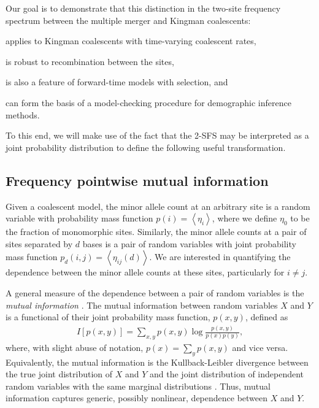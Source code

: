 \documentclass[11pt, letterpaper]{article}   	%
\newcommand{\E}[1]{\left< #1 \right>}
\begin{document}
Our goal is to demonstrate that this distinction in the two-site frequency spectrum between the multiple merger and Kingman coalescents:
\begin{enumerate*}
    \item applies to Kingman coalescents with time-varying coalescent rates,
    \item is robust to recombination between the sites,
    \item is also a feature of forward-time models with selection, and
    \item can form the basis of a model-checking procedure for demographic inference methods.
\end{enumerate*}
To this end, we will make use of the fact that the 2-SFS may be interpreted as a joint probability distribution to define the following useful transformation.

\subsection*{Frequency pointwise mutual information}

Given a coalescent model, the minor allele count at an arbitrary site is a random variable with probability mass function $p(i) = \E{\eta_i}$, where we define $\eta_0$ to be the fraction of monomorphic sites.
Similarly, the minor allele counts at a pair of sites separated by $d$ bases is a pair of random variables with joint probability mass function $p_d(i,j) = \E{\eta_{ij}(d)}$.
We are interested in quantifying the dependence between the minor allele counts at these sites, particularly for $i\neq j$.

A general measure of the dependence between a pair of random variables is the \textit{mutual information} \autocite{CoverThomas1991}.
The mutual information between random variables $X$ and $Y$ is a functional of their joint probability mass function, $p(x,y)$, defined as
\begin{align}
    I[p(x,y)] = \sum_{x,y} p(x,y) \log \frac{p(x,y)}{p(x)p(y)},
    \label{eq:mutual_information}
\end{align}
where, with slight abuse of notation, $p(x) = \sum_y p(x,y)$ and vice versa.
Equivalently, the mutual information is the Kullback-Leibler divergence between the true joint distribution of $X$ and $Y$ and the joint distribution of independent random variables with the same marginal distributions \autocite{CoverThomas1991}.
Thus, mutual information captures generic, possibly nonlinear, dependence between $X$ and $Y$.
\end{document}
